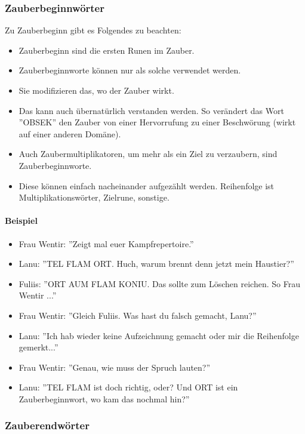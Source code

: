 \documentclass{article}
\begin{document}
\subsubsection{Zauberbeginnwörter}

Zu Zauberbeginn gibt es Folgendes zu beachten:

\begin{itemize}
\item Zauberbeginn sind die ersten Runen im Zauber.
\item Zauberbeginnworte können nur als solche verwendet werden.
\item Sie modifizieren das, wo der Zauber wirkt.
\item Das kann auch übernatürlich verstanden werden. So verändert das Wort ''OBSEK'' den Zauber von einer Hervorrufung zu einer Beschwörung (wirkt auf einer anderen Domäne).
\item Auch Zaubermultiplikatoren, um mehr als ein Ziel zu verzaubern, sind Zauberbeginnworte.
\item Diese können einfach nacheinander aufgezählt werden. Reihenfolge ist Multiplikationswörter, Zielrune, sonstige.
\end{itemize}

\paragraph{Beispiel}

\begin{itemize}
\item Frau Wentir: ''Zeigt mal euer Kampfrepertoire.''
\item Lanu: ''TEL FLAM ORT. Huch, warum brennt denn jetzt mein Haustier?''
\item Fuliis: ''ORT AUM FLAM KONIU. Das sollte zum Löschen reichen. So Frau Wentir ...''
\item Frau Wentir: ''Gleich Fuliis. Was hast du falsch gemacht, Lanu?''
\item Lanu: ''Ich hab wieder keine Aufzeichnung gemacht oder mir die Reihenfolge gemerkt...''
\item Frau Wentir: ''Genau, wie muss der Spruch lauten?''
\item Lanu: ''TEL FLAM ist doch richtig, oder? Und ORT ist ein Zauberbeginnwort, wo kam das nochmal hin?''
\end{itemize}

\subsubsection{Zauberendwörter}
\end{document}
